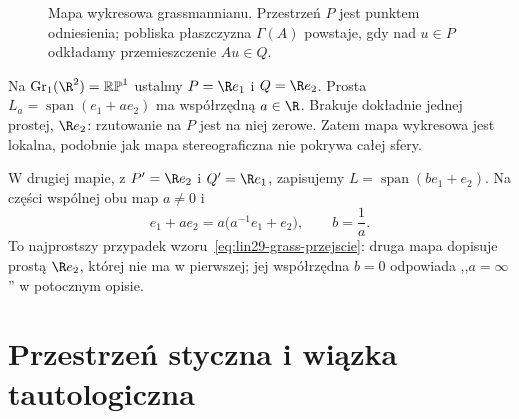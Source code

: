 \begin{figure}[!htbp]
\centering
{}
\caption{Mapa wykresowa grassmannianu. Przestrzeń $P$ jest
punktem odniesienia; pobliska płaszczyzna $\Gamma(A)$ powstaje,
gdy nad $u\in P$ odkładamy przemieszczenie $Au\in Q$.}
\label{fig:lin29-grass-wykres}
\end{figure}

\begin{przyklad}
\label{prz:lin29-grass-rp1-mapy}
Na $\operatorname{Gr}_1(\R^2)=\mathbb{RP}^1$ ustalmy
$P=\R e_1$ i $Q=\R e_2$. Prosta
$L_a=\operatorname{span}(e_1+ae_2)$ ma współrzędną
$a\in\R$. Brakuje dokładnie jednej prostej, $\R e_2$:
rzutowanie na $P$ jest na niej zerowe. Zatem mapa
wykresowa jest lokalna, podobnie jak mapa stereograficzna
nie pokrywa całej sfery.

W drugiej mapie, z $P'=\R e_2$ i $Q'=\R e_1$,
zapisujemy $L=\operatorname{span}(be_1+e_2)$.
Na części wspólnej obu map $a\ne0$ i
\[
 e_1+ae_2=a\bigl(a^{-1}e_1+e_2\bigr),
 \qquad b=\frac1a.
\]
To najprostszy przypadek wzoru~\eqref{eq:lin29-grass-przejscie}:
druga mapa dopisuje prostą $\R e_2$, której nie ma
w pierwszej; jej współrzędna $b=0$ odpowiada
,,$a=\infty$'' w potocznym opisie.
\end{przyklad}

\section{Przestrzeń styczna i wiązka tautologiczna}
\label{sec:lin29-grass-styczna}

